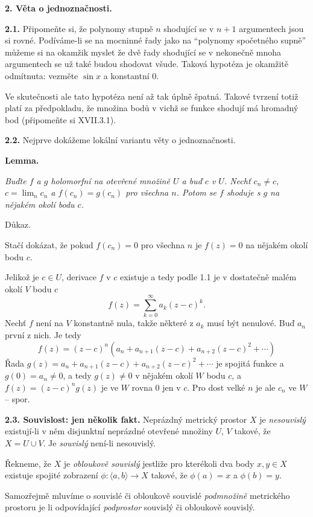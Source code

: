 \documentclass[12pt]{article}
\begin{document}
\vskip10mm
 
 {\large\bf 2.  Věta o jednoznačnosti.}
 
 \bigskip

{\bf 2.1.} Připomeňte si, že polynomy stupně
 $n$ shodující se v $n+1$ argumentech jsou si rovné. Podíváme-li se na mocninné  řady jako na ``polynomy spočetného supně'' můžeme si na okamžik myslet že dvě  řady shodující se v nekonečně mnoha argumentech se už také budou shodovat všude. Taková hypotéza je okamžitě odmítnuta: vezměte $\sin x$ a konstantní 0.

Ve skutečnosti ale tato hypotéza není až tak úplně špatná. Takové tvrzení totiž platí za předpokladu, že množina bodů v vichž se funkce shodují má hromadný bod
 (připomeňte si XVII.3.1).

\bigskip

{\bf 2.2.} Nejprve dokážeme lokální variantu věty o jednoznačnosti.

\medskip 

{\bf Lemma.} {\em Buďte $f$ a $g$  holomorfní na otevřené množině $U$ a buď $c$ v $U$. Nechť $c_n\neq c$, $c=\lim_n c_n$ a $f(c_n)=g(c_n)$ pro všechna $n$. Potom se $f$ shoduje s $g$ na nějakém okolí bodu $c$.

Důkaz.} Stačí dokázat, že pokud $f(c_n)=0$ pro všechna $n$ je $f(z)=0$
na nějakém okolí bodu $c$.

Jelikož je $c\in U$, derivace $f$ v $c$ existuje a tedy podle 1.1 je v dostatečně malém okolí $V$ bodu $c$
$$
f(z)=\sum_{k=0}^\infty a_k(z-c)^k.
$$
Nechť $f$ není na $V$ konstantně nula, takže některé z $a_k$ musí být nenulové. Buď $a_n$ první z nich. Je tedy
$$
f(z)=(z-c)^n(a_n+ a_{n+1}(z-c)+a_{n+2}(z-c)^2+\cdots)
$$
Řada $g(z)=a_n+ a_{n+1}(z-c)+a_{n+2}(z-c)^2+\cdots$ je spojitá funkce a $g(0)=a_n\neq 0$, a tedy   $g(z)\neq 0$ v nějakém okolí  $W$ bodu $c$, a $f(z)=(z-c)^ng(z)$ je ve $W$ rovna $0$ jen v $c$. Pro dost velké
 $n$ je ale $c_n$ ve $W$ -- spor.\sq

\bigskip

{\bf 2.3. Souvislost: jen několik fakt.} Neprázdný metrický prostor $X$ je {\em nesouvislý} existují-li v něm disjunktní neprázdné otevřené množiny  $U$, $V$ takové, že $X=U\cup V$. Je {\em souvislý} není-li nesouvislý.

Řekneme, že $X$ je {\em obloukově souvislý} jestliže pro kterékoli dva body $x,y\in X$ existuje spojité zobrazení
 $\phi:\langle a,b\rangle\to X$ takové, že $\phi(a)=x$ a
$\phi(b)=y$.

Samozřejmě mluvíme o souvislé či obloukově souvislé  {\em podmnožině} metrického prostoru je li odpovídající {\em podprostor} souvislý či obloukově souvislý.
\end{document}
